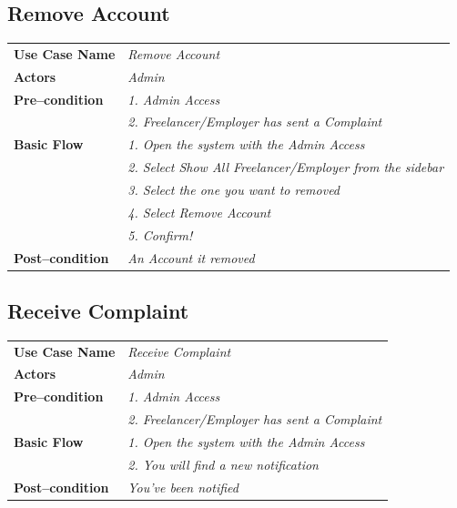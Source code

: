 \documentclass{article}
\begin{document}
\subsection{Remove Account}
    \begin{tabular}{ l | l }
    \toprule
      \rowcolor{LightCyan}
      \textbf{Use Case Name}    & \textit{Remove Account}\\
      \textbf{Actors}           & \textit{Admin}\\
      \rowcolor{LightCyan}
      \textbf{Pre--condition}   & \textit{1. Admin Access}\\
                                  \rowcolor{LightCyan}
                                & \textit{2. Freelancer/Employer has sent a Complaint}\\
      \textbf{Basic Flow}       & \textit{1. Open the system with the Admin Access}\\
                                & \textit{2. Select Show All Freelancer/Employer from the sidebar}\\
                                & \textit{3. Select the one you want to removed}\\
                                & \textit{4. Select Remove Account}\\
                                & \textit{5. Confirm!}\\
      \rowcolor{LightCyan}
      \textbf{Post--condition}  & \textit{An Account it removed}\\
    \toprule
    \end{tabular}




\subsection{Receive Complaint}
    \begin{tabular}{ l | l }
    \toprule
      \rowcolor{LightCyan}
      \textbf{Use Case Name}    & \textit{Receive Complaint}\\
      \textbf{Actors}           & \textit{Admin}\\
      \rowcolor{LightCyan}
      \textbf{Pre--condition}   & \textit{1. Admin Access}\\
                                  \rowcolor{LightCyan}
                                & \textit{2. Freelancer/Employer has sent a Complaint}\\
      \textbf{Basic Flow}       & \textit{1. Open the system with the Admin Access}\\
                                & \textit{2. You will find a new notification}\\
      \rowcolor{LightCyan}
      \textbf{Post--condition}  & \textit{You've been notified}\\
    \toprule
    \end{tabular}
\end{document}
